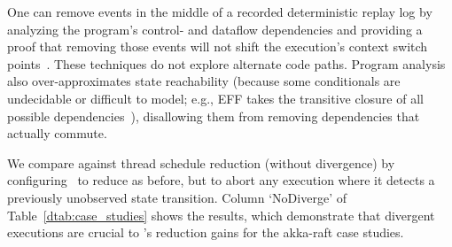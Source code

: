 %
%
%
 One can remove events in the middle of a recorded deterministic
replay log by analyzing the program's control- and
dataflow dependencies and providing a proof that removing those events will not shift the
execution's context switch points~\cite{Lee:2011:TGR:1993498.1993528,tallam2007enabling,huang2012lean,cai2013lock,elyasov2013guided,wang2015fast}.
These techniques do not explore alternate code paths. Program analysis also
over-approximates
state reachability (because some conditionals are undecidable or difficult to
model; e.g., EFF takes the transitive closure of all possible
dependencies~\cite{Lee:2011:TGR:1993498.1993528}), disallowing them from removing dependencies that actually commute.

We compare against thread schedule reduction (without divergence) by
configuring \sys~to reduce as before,
but to abort any execution
where it detects a previously unobserved state transition. Column `NoDiverge'
of Table~\ref{dtab:case_studies} shows the results, which demonstrate that
divergent executions are crucial to \sys's reduction gains for the akka-raft case studies.


